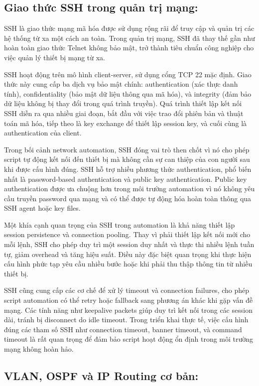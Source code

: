 \subsection{Giao thức SSH trong quản trị mạng:}
    SSH là giao thức mạng mã hóa được sử dụng rộng rãi để truy cập và quản trị các hệ thống từ xa một cách an toàn. Trong quản trị mạng, SSH đã thay thế gần như hoàn toàn giao thức Telnet không bảo mật, trở thành tiêu chuẩn công nghiệp cho việc quản lý thiết bị mạng từ xa.

    SSH hoạt động trên mô hình client-server, sử dụng cổng TCP 22 mặc định. Giao thức này cung cấp ba dịch vụ bảo mật chính: authentication (xác thực danh tính), confidentiality (bảo mật dữ liệu thông qua mã hóa), và integrity (đảm bảo dữ liệu không bị thay đổi trong quá trình truyền). Quá trình thiết lập kết nối SSH diễn ra qua nhiều giai đoạn, bắt đầu với việc trao đổi phiên bản và thuật toán mã hóa, tiếp theo là key exchange để thiết lập session key, và cuối cùng là authentication của client.

    Trong bối cảnh network automation, SSH đóng vai trò then chốt vì nó cho phép script tự động kết nối đến thiết bị mà không cần sự can thiệp của con người sau khi được cấu hình đúng. SSH hỗ trợ nhiều phương thức authentication, phổ biến nhất là password-based authentication và public key authentication. Public key authentication được ưa chuộng hơn trong môi trường automation vì nó không yêu cầu truyền password qua mạng và có thể được tự động hóa hoàn toàn thông qua SSH agent hoặc key files.

    Một khía cạnh quan trọng của SSH trong automation là khả năng thiết lập session persistence và connection pooling. Thay vì phải thiết lập kết nối mới cho mỗi lệnh, SSH cho phép duy trì một session duy nhất và thực thi nhiều lệnh tuần tự, giảm overhead và tăng hiệu suất. Điều này đặc biệt quan trọng khi thực hiện cấu hình phức tạp yêu cầu nhiều bước hoặc khi phải thu thập thông tin từ nhiều thiết bị.
    
    SSH cũng cung cấp các cơ chế để xử lý timeout và connection failures, cho phép script automation có thể retry hoặc fallback sang phương án khác khi gặp vấn đề mạng. Các tính năng như keepalive packets giúp duy trì kết nối trong các session dài, tránh bị disconnect do idle timeout. Trong triển khai thực tế, việc cấu hình đúng các tham số SSH như connection timeout, banner timeout, và command timeout là rất quan trọng để đảm bảo script hoạt động ổn định trong môi trường mạng không hoàn hảo.
\subsection{VLAN, OSPF và IP Routing cơ bản:}
